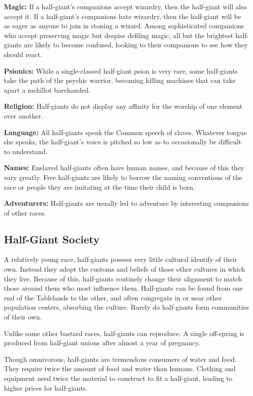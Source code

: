 \textbf{Magic:} If a half-giant's companions accept wizardry, then the half-giant will also accept it. If a half-giant's companions hate wizardry, then the half-giant will be as eager as anyone to join in stoning a wizard. Among sophisticated companions who accept preserving magic but despise defiling magic, all but the brightest half-giants are likely to become confused, looking to their companions to see how they should react.

\textbf{Psionics:} While a single-classed half-giant psion is very rare, some half-giants take the path of the psychic warrior, becoming killing machines that can take apart a mekillot barehanded.

\textbf{Religion:} Half-giants do not display any affinity for the worship of one element over another.

\textbf{Language:} All half-giants speak the Common speech of slaves. Whatever tongue she speaks, the half-giant's voice is pitched so low as to occasionally be difficult to understand.

\textbf{Names:} Enslaved half-giants often have human names, and because of this they vary greatly. Free half-giants are likely to borrow the naming conventions of the race or people they are imitating at the time their child is born.

\textbf{Adventurers:} Half-giants are usually led to adventure by interesting companions of other races.

\subsection{Half-Giant Society}
A relatively young race, half-giants possess very little cultural identify of their own. Instead they adopt the customs and beliefs of those other cultures in which they live. Because of this, half-giants routinely change their alignment to match those around them who most influence them.
Half-giants can be found from one end of the Tablelands to the other, and often congregate in or near other population centers, absorbing the culture. Rarely do half-giants form communities of their own.

Unlike some other bastard races, half-giants can reproduce. A single off-spring is produced from half-giant unions after almost a year of pregnancy.

Though omnivorous, half-giants are tremendous consumers of water and food. They require twice the amount of food and water than humans. Clothing and equipment need twice the material to construct to fit a half-giant, leading to higher prices for half-giants.

